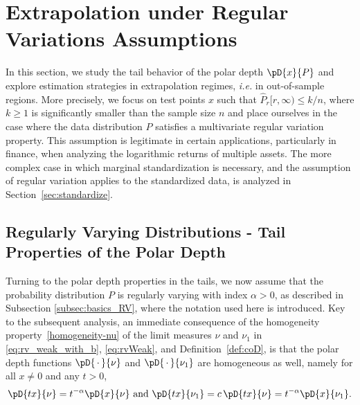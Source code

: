 \documentclass{article}
\numberwithin{equation}{section}
\newcommand{\point}{\,\cdot\,}
\newcommand{\coD}[2]{\pD{#1}{#2}}
\begin{document}
\section{Extrapolation under Regular Variations Assumptions}\label{sec:Extremes}

%

In this section, we study the tail behavior of the polar depth $\coD{x}{P}$ and explore
estimation strategies in extrapolation regimes, \textit{i.e.} in out-of-sample
regions. More precisely, we focus on test
points \( x \) such that \( \widehat{P}_r[r, \infty) \leq k/n \),
where \( k \geq 1 \) is significantly smaller than the sample
size \( n \) and place ourselves in the case where the
data distribution $P$  satisfies a multivariate regular variation property. This
assumption is legitimate in certain applications, particularly in finance,
when analyzing the logarithmic returns of multiple assets.
The more complex case in which marginal standardization is necessary, and
the assumption of regular variation applies to the standardized data, is analyzed in Section~\ref{sec:standardize}.



\subsection{Regularly Varying Distributions - Tail Properties of the
Polar Depth}\label{sec:tail_codepth-proba}


Turning to the polar depth properties in the tails, we now assume
that the probability distribution $P$ is regularly varying with index
$\alpha>0$, as described in Subsection \ref{subsec:basics_RV}, where
the notation used here is introduced. Key to the subsequent analysis, an immediate consequence
of the homogeneity
property~\eqref{homogeneity-nu} of the limit measures $\nu$  and $\nu_1$ in
 \eqref{eq:rv_weak_with_b}, \eqref{eq:rvWeak}, 
and Definition~\ref{def:coD},  is
that the polar depth functions $\coD{\point}{\nu}$ and
$\coD{\point}{\nu_1}$ are homogeneous as well, namely
for all $x\neq 0$ and any $t>0$, 
\begin{equation}\label{eq:homogeneous_coD_nu}
    \coD{tx}{\nu} = t^{-\alpha} \coD{x}{\nu} \text{ and }
    \coD{tx}{\nu_1} = c\, \coD{tx}{\nu}= t^{-\alpha} \coD{x}{\nu_1} .
\end{equation}
\end{document}
